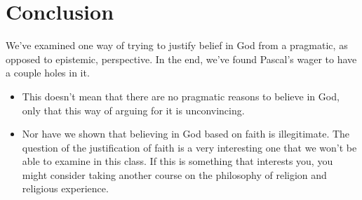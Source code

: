 \section{Conclusion}
We've examined one way of trying to justify belief in God from a pragmatic, as opposed to epistemic, perspective. In the end, we've found Pascal's wager to have a couple holes in it.
\begin{itemize}
 \item This doesn't mean that there are no pragmatic reasons to believe in God, only that this way of arguing for it is unconvincing.
 \item Nor have we shown that believing in God based on faith is illegitimate. The question of the justification of faith is a very interesting one that we won't be able to examine in this class. If this is something that interests you, you might consider taking another course on the philosophy of religion and religious experience.
\end{itemize}

